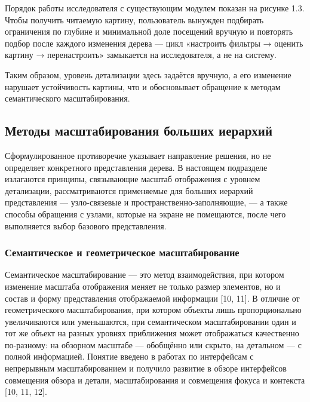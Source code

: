 
Порядок работы исследователя с существующим модулем показан на рисунке 1.3. Чтобы получить читаемую картину, пользователь вынужден подбирать ограничения по глубине и минимальной доле посещений вручную и повторять подбор после каждого изменения дерева — цикл «настроить фильтры → оценить картину → перенастроить» замыкается на исследователя, а не на систему.


Таким образом, уровень детализации здесь задаётся вручную, а его изменение нарушает устойчивость картины, что и обосновывает обращение к методам семантического масштабирования.

\subsection{Методы масштабирования больших иерархий}

Сформулированное противоречие указывает направление решения, но не определяет конкретного представления дерева. В настоящем подразделе излагаются принципы, связывающие масштаб отображения с уровнем детализации, рассматриваются применяемые для больших иерархий представления — узло-связевые и пространственно-заполняющие, — а также способы обращения с узлами, которые на экране не помещаются, после чего выполняется выбор базового представления.

\subsubsection{Семантическое и геометрическое масштабирование}

Семантическое масштабирование — это метод взаимодействия, при котором изменение масштаба отображения меняет не только размер элементов, но и состав и форму представления отображаемой информации [10, 11]. В отличие от геометрического масштабирования, при котором объекты лишь пропорционально увеличиваются или уменьшаются, при семантическом масштабировании один и тот же объект на разных уровнях приближения может отображаться качественно по-разному: на обзорном масштабе — обобщённо или скрыто, на детальном — с полной информацией. Понятие введено в работах по интерфейсам с непрерывным масштабированием и получило развитие в обзоре интерфейсов совмещения обзора и детали, масштабирования и совмещения фокуса и контекста [10, 11, 12].

